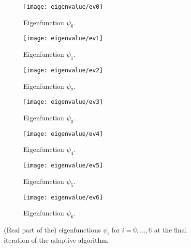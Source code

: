 \begin{figure}[htbp]
    \begin{subfigure}[t]{0.49\textwidth}
        \centering
        \texttt{[image: eigenvalue/ev0]}
        \caption{Eigenfunction \(\psi_0\).}
        \label{fig:eigenfunction_0}
    \end{subfigure}
    \begin{subfigure}[t]{0.49\textwidth}
        \centering
        \texttt{[image: eigenvalue/ev1]}
        \caption{Eigenfunction \(\psi_1\).}
        \label{fig:eigenfunction_1}
    \end{subfigure}
    \vspace{1cm}
    \begin{subfigure}[t]{0.49\textwidth}
        \centering
        \texttt{[image: eigenvalue/ev2]}
        \caption{Eigenfunction \(\psi_2\).}
        \label{fig:eigenfunction_2}
    \end{subfigure}
    \begin{subfigure}[t]{0.49\textwidth}
        \centering
        \texttt{[image: eigenvalue/ev3]}
        \caption{Eigenfunction \(\psi_3\).}
        \label{fig:eigenfunction_3}
    \end{subfigure}
    \vspace{1cm}
    \begin{subfigure}[t]{0.49\textwidth}
        \centering
        \texttt{[image: eigenvalue/ev4]}
        \caption{Eigenfunction \(\psi_4\).}
        \label{fig:eigenfunction_4}
    \end{subfigure}
    \begin{subfigure}[t]{0.49\textwidth}
        \centering
        \texttt{[image: eigenvalue/ev5]}
        \caption{Eigenfunction \(\psi_5\).}
        \label{fig:eigenfunction_5}
    \end{subfigure}
    \vspace{1cm}
    \begin{subfigure}[t]{0.49\textwidth}
        \centering
        \texttt{[image: eigenvalue/ev6]}
        \caption{Eigenfunction \(\psi_6\).}
        \label{fig:eigenfunction_6}
    \end{subfigure}
    \caption{(Real part of the) eigenfunctions \(\psi_i\) for \(i = 0, \ldots, 6\) at the final iteration of the adaptive algorithm.}
\end{figure}


